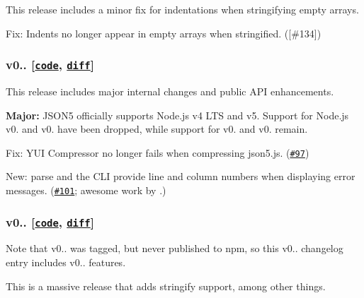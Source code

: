 This release includes a minor fix for indentations when stringifying empty arrays.


\begin{DoxyItemize}
\item Fix\+: Indents no longer appear in empty arrays when stringified. (\mbox{[}\#134\mbox{]})
\end{DoxyItemize}

\subsubsection*{v0.. \mbox{[}\href{https://github.com/aseemk/json5/tree/v0.5.0}{\tt code}, \href{https://github.com/aseemk/json5/compare/v0.4.0...v0.5.0}{\tt diff}\mbox{]}}

This release includes major internal changes and public A\+PI enhancements.


\begin{DoxyItemize}
\item {\bfseries Major\+:} J\+S\+O\+N5 officially supports Node.\+js v4 L\+TS and v5. Support for Node.\+js v0. and v0. have been dropped, while support for v0. and v0. remain.
\item Fix\+: Y\+UI Compressor no longer fails when compressing json5.\+js. (\href{https://github.com/aseemk/json5/pull/97}{\tt \#97})
\item New\+: {\ttfamily parse} and the C\+LI provide line and column numbers when displaying error messages. (\href{https://github.com/aseemk/json5/pull/101}{\tt \#101}; awesome work by \href{https://github.com/amb26}{\tt }.)
\end{DoxyItemize}

\subsubsection*{v0.. \mbox{[}\href{https://github.com/aseemk/json5/tree/v0.4.0}{\tt code}, \href{https://github.com/aseemk/json5/compare/v0.2.0...v0.4.0}{\tt diff}\mbox{]}}

Note that v0.. was tagged, but never published to npm, so this v0.. changelog entry includes v0.. features.

This is a massive release that adds {\ttfamily stringify} support, among other things.


